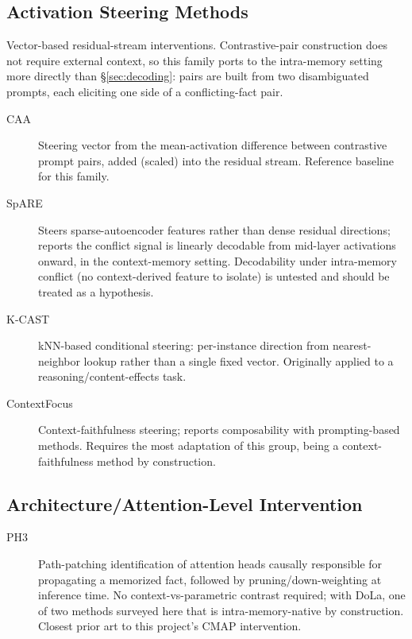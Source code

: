 \documentclass[11pt]{article}
\begin{document}
\subsection{Activation Steering Methods}
\label{sec:steering}

Vector-based residual-stream interventions. Contrastive-pair construction does
not require external context, so this family ports to the intra-memory
setting more directly than \S\ref{sec:decoding}: pairs are built from two
disambiguated prompts, each eliciting one side of a conflicting-fact pair.

\begin{description}
  \item[CAA] \citep{rimsky2024steering} Steering vector from the
    mean-activation difference between contrastive prompt pairs, added
    (scaled) into the residual stream. Reference baseline for this family.
  \item[SpARE] \citep{zhao2024spare} Steers sparse-autoencoder features rather
    than dense residual directions; reports the conflict signal is linearly
    decodable from mid-layer activations onward, in the context-memory
    setting. Decodability under intra-memory conflict (no context-derived
    feature to isolate) is untested and should be treated as a hypothesis.
  \item[K-CAST] \citep{valentino2025mitigating} kNN-based conditional
    steering: per-instance direction from nearest-neighbor lookup rather than
    a single fixed vector. Originally applied to a reasoning/content-effects
    task.
  \item[ContextFocus] \citep{anand2026contextfocus} Context-faithfulness
    steering; reports composability with prompting-based methods. Requires
    the most adaptation of this group, being a context-faithfulness method by
    construction.
\end{description}

\subsection{Architecture/Attention-Level Intervention}
\label{sec:attention}

\begin{description}
  \item[PH3] \citep{jin2024cutting} Path-patching identification of attention
    heads causally responsible for propagating a memorized fact, followed by
    pruning/down-weighting at inference time. No context-vs-parametric
    contrast required; with DoLa, one of two methods surveyed here that is
    intra-memory-native by construction. Closest prior art to this project's
    CMAP intervention.
\end{description}
\end{document}
